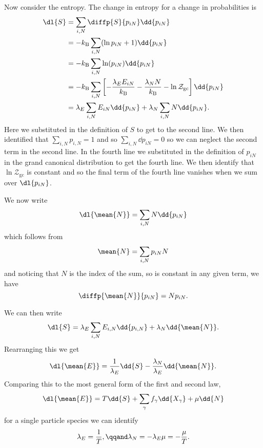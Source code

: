 \documentclass[fleqn]{NotesClass}
\newcommand*{\boltzmann}{k_{\mathrm{B}}}
\newcommand*{\gcpartition}{\mathcal{Z}_{\mathrm{gc}}}
\begin{document}
    Now consider the entropy.
    The change in entropy for a change in probabilities is
    \begin{align}
        \dl{S} &= \sum_{i,N} \diffp{S}{p_{iN}} \dd{p_{iN}}\\
        &= -\boltzmann \sum_{i,N} (\ln p_{iN} + 1) \dd{p_{iN}}\\
        &= -\boltzmann \sum_{i,N} \ln (p_{iN})\dd{p_{iN}}\\
        &= -\boltzmann \sum_{i,N} \left[ -\frac{\lambda_E E_{iN}}{\boltzmann} - \frac{\lambda_N N}{\boltzmann} - \ln \gcpartition \right] \dd{p_{iN}}\\
        &= \lambda_E \sum_{i,N} E_{iN} \dd{p_{iN}} + \lambda_N \sum_{i,N} N\dd{p_{iN}}.
    \end{align}
    Here we substituted in the definition of \(S\) to get to the second line.
    We then identified that \(\sum_{i,N}p_{i,N} = 1\) and so \(\sum_{i,N}\dd{p_{iN}} = 0\) so we can neglect the second term in the second line.
    In the fourth line we substituted in the definition of \(p_{iN}\) in the grand canonical distribution to get the fourth line.
    We then identify that \(\ln\gcpartition\) is constant and so the final term of the fourth line vanishes when we sum over \(\dl{p_{iN}}\).
    
    We now write
    \begin{equation}
        \dl{\mean{N}} = \sum_{i,N} N \dd{p_{iN}}
    \end{equation}
    which follows from
    \begin{equation}
        \mean{N} = \sum_{i,N} p_{iN}N
    \end{equation}
    and noticing that \(N\) is the index of the sum, so is constant in any given term, we have
    \begin{equation}
        \diffp{\mean{N}}{p_{iN}} = Np_{iN}.
    \end{equation}
    
    We can then write
    \begin{equation}
        \dl{S} = \lambda_E \sum_{i, N} E_{i, N} \dd{p_{i,N}} + \lambda_N \dd{\mean{N}}.
    \end{equation}
    Rearranging this we get
    \begin{equation}
        \dl{\mean{E}} = \frac{1}{\lambda_E} \dd{S} - \frac{\lambda_N}{\lambda_E} \dd{\mean{N}}.
    \end{equation}
    Comparing this to the most general form of the first and second law,
    \begin{equation}
        \dl{\mean{E}} = T\dd{S} + \sum_\gamma f_\gamma \dd{X_\gamma} + \mu \dd{N}
    \end{equation}
    for a single particle species we can identify
    \begin{equation}
        \lambda_E = \frac{1}{T}, \qqand \lambda_N = -\lambda_E \mu = -\frac{\mu}{T}.
    \end{equation}
    
\end{document}

